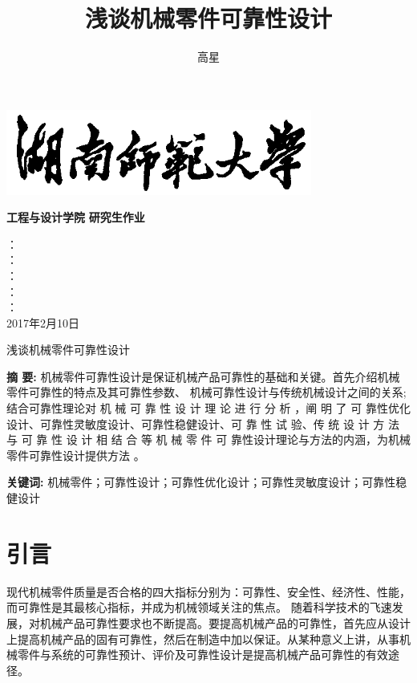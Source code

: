 \documentclass[a4paper,12pt]{article}
\title{浅谈机械零件可靠性设计}
\author{高星}
\begin{document}
	
\begin{titlepage}
\begin{center}
\includegraphics[height=2.8cm]{images/hnsfdx} \vspace{1cm}

{ \bf \kai  \fontsize{42pt}{80pt}\selectfont 工程与设计学院 }
\vfill
{ \bf \hei  \fontsize{42pt}{80pt}\selectfont 研究生作业 }
\vfill \vfill

\sanhao \linespread{2}
 ：~
\underline{ }\\
 ：~
\underline{ }\\
 ：~
\underline{ }\\
 ：~
\underline{ }\\ ：~
\underline{ }\\			   
\vfill
2017年2月10日
\end{center}
\end{titlepage}

\sihao
\begin{center}
	 \erhao  \hei  浅谈机械零件可靠性设计
\end{center} 
\sihao \setlength{\parindent}{2em}    

{\bf 摘 要: }机械零件可靠性设计是保证机械产品可靠性的基础和关键。首先介绍机械零件可靠性的特点及其可靠性参数、 机械可靠性设计与传统机械设计之间的关系;结合可靠性理论对 机 械 可 靠 性 设 计 理 论 进 行 分 析 ，阐 明 了 可 靠性优化设计、可靠性灵敏度设计、可靠性稳健设计、可 靠 性 试 验、传 统 设 计 方 法 与 可 靠 性 设 计 相 结 合 等 机 械 零 件 可 靠性设计理论与方法的内涵，为机械零件可靠性设计提供方法 。

{\bf 关键词: }机械零件；可靠性设计；可靠性优化设计；可靠性灵敏度设计；可靠性稳健设计

\setcounter{section}{-1}
\section{引言} 
\sihao \setlength{ \baselineskip }{25pt}
现代机械零件质量是否合格的四大指标分别为：可靠性、安全性、经济性、性能，而可靠性是其最核心指标，并成为机械领域关注的焦点。
随着科学技术的飞速发展，对机械产品可靠性要求也不断提高。要提高机械产品的可靠性，首先应从设计上提高机械产品的固有可靠性，然后在制造中加以保证。从某种意义上讲，从事机械零件与系统的可靠性预计、评价及可靠性设计是提高机械产品可靠性的有效途径。
\end{document}
